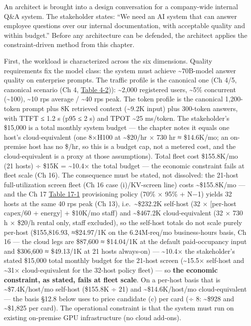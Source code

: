 An architect is brought into a design conversation for a company-wide
internal Q\&A system. The stakeholder states: ``We need an AI system
that can answer employee questions over our internal documentation, with
acceptable quality and within budget.'' Before any architecture can be
defended, the architect applies the constraint-driven method from this
chapter.

First, the workload is characterized across the six dimensions. Quality
requirements fix the model class: the system must achieve
\textasciitilde70B-model answer quality on enterprise prompts. The
traffic profile is the canonical one (Ch 4/5, canonical scenario (Ch 4,
\hyperref[tab:4.2]{Table 4-2})): \textasciitilde2,000 registered users, \textasciitilde5\%
concurrent (\textasciitilde100), \textasciitilde10 rps average /
\textasciitilde40 rps peak. The token profile is the canonical
1,200-token prompt plus 8K retrieved context (\textasciitilde9.2K input)
plus 300-token answers, with TTFT ≤ 1.2 s (p95 ≤ 2 s) and TPOT
\textasciitilde25 ms/token. The stakeholder's \$15,000 is a total
monthly system budget --- the chapter notes it equals one host's
cloud-equivalent (one 8×H100 at \textasciitilde\$20/hr × 730 hr ≈
\$14.6K/mo; an on-premise host has no \$/hr, so this is a budget cap,
not a metered cost, and the cloud-equivalent is a proxy at those
assumptions). Total fleet cost \$155.8K/mo (21 hosts) ÷ \$15K =
\textasciitilde10.4× the total budget --- the economic constraint fails
at fleet scale (Ch 16). The consequence must be stated, not dissolved:
the 21-host full-utilization screen fleet (Ch 16 case (i)/KV-screen
line) costs \textasciitilde\$155.8K/mo --- and the Ch 17 \hyperref[tab:17.1]{Table 17-1}
provisioning policy (70\% × 95\% + N−1) yields 32 hosts at the same 40
rps peak (Ch 13), i.e.~\textasciitilde\$232.2K self-host (32 ×
{[}per-host capex/60 + energy{]} + \$10K/mo staff) and
\textasciitilde\$467.2K cloud-equivalent (32 × 730 h × \$20/h rental
only, staff excluded), so the self-host totals do not scale purely
per-host (\$155,816.93, ≈\$24.97/1K on the 6.24M‑req/mo business‑hours
basis, Ch 16 --- the cloud legs are \$87,600 ≈ \$14.04/1K at the default
paid-occupancy input and \$306,600 ≈ \$49.13/1K at 21 hosts always-on)
--- \textasciitilde10.4× the stakeholder's stated \$15,000 total monthly
budget for the 21-host screen (\textasciitilde15.5× self-host and
\textasciitilde31× cloud-equivalent for the 32-host policy fleet) --- so
\textbf{the economic constraint, as stated, fails at fleet scale}. On a
per-host basis that is \textasciitilde\$7.4K/host/mo self-host (\$155.8K
÷ 21) and \textasciitilde\$14.6K/host/mo cloud-equivalent --- the basis
§12.8 below uses to price candidate (c) per card (÷ 8:
\textasciitilde\$928 and \textasciitilde\$1,825 per card). The
operational constraint is that the system must run on existing
on-premise GPU infrastructure (no cloud add-ons).

